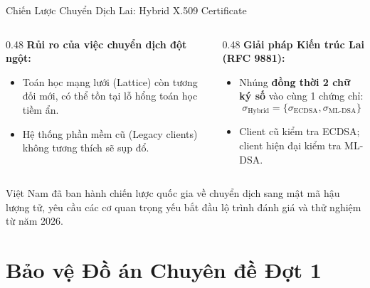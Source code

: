 \begin{frame}{Chiến Lược Chuyển Dịch Lai: Hybrid X.509 Certificate}
  \begin{columns}[T]
    \begin{column}{0.48\textwidth}
      \textbf{Rủi ro của việc chuyển dịch đột ngột:}
      \begin{itemize}\small
        \item Toán học mạng lưới (Lattice) còn tương đối mới, có thể tồn tại lỗ hổng toán học tiềm ẩn.
        \item Hệ thống phần mềm cũ (Legacy clients) không tương thích sẽ sụp đổ.
      \end{itemize}
    \end{column}
    \begin{column}{0.48\textwidth}
      \textbf{Giải pháp Kiến trúc Lai (RFC 9881):}
      \begin{itemize}\small
        \item Nhúng \textbf{đồng thời 2 chữ ký số} vào cùng 1 chứng chỉ:
          $$\sigma_{\text{Hybrid}} = \{\sigma_{\text{ECDSA}}, \sigma_{\text{ML-DSA}}\}$$
        \item Client cũ kiểm tra ECDSA; client hiện đại kiểm tra ML-DSA.
      \end{itemize}
    \end{column}
  \end{columns}

  \begin{keybox}
    Việt Nam đã ban hành chiến lược quốc gia về chuyển dịch sang mật mã hậu lượng tử, yêu cầu các cơ quan trọng yếu bắt đầu lộ trình đánh giá và thử nghiệm từ năm 2026.
  \end{keybox}
\end{frame}

\section{Bảo vệ Đồ án Chuyên đề Đợt 1}

